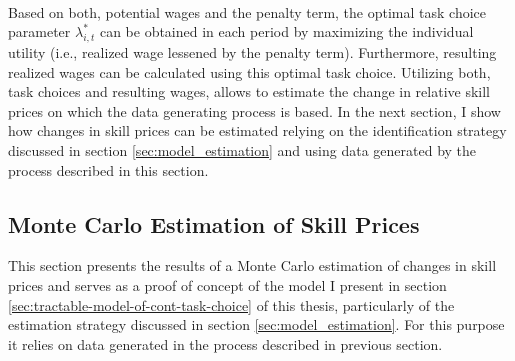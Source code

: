 \documentclass[../main.tex]{subfiles}
\begin{document}
\\ 
Based on both, potential wages and the penalty term, the optimal task choice parameter $\lambda_{i,t}^*$ can be obtained in each period by maximizing the individual utility (i.e., realized wage lessened by the penalty term). Furthermore, resulting realized wages can be calculated using this optimal task choice. Utilizing both, task choices and resulting wages, allows to estimate the change in relative skill prices on which the data generating process is based. In the next section, I show how changes in skill prices can be estimated relying on the identification strategy discussed in section \ref{sec:model_estimation} and using data generated by the process described in this section.

\subsection{Monte Carlo Estimation of Skill Prices} \label{sec:MC_estimation}
This section presents the results of a Monte Carlo estimation of changes in skill prices and serves as a proof of concept of the model I present in section \ref{sec:tractable-model-of-cont-task-choice} of this thesis, particularly of the estimation strategy discussed in section \ref{sec:model_estimation}. For this purpose it relies on data generated in the process described in previous section.
\\
\end{document}
